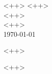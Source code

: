 \documentclass[12pt]{article}
\newcommand{\first}{<++>}
\newcommand{\last} {<++>}
\newcommand{\prof} {<++>}
\newcommand{\class}{<++>}
\begin{document}
\begin{flushleft}

\first{} \last{} \\
\prof{} \\
\class{} \\
\today{} \\

\begin{center}
<++>
\end{center}
\setlength{\parindent}{0.5in}

<++>

\printbibliography{}
\end{flushleft}
\end{document}
